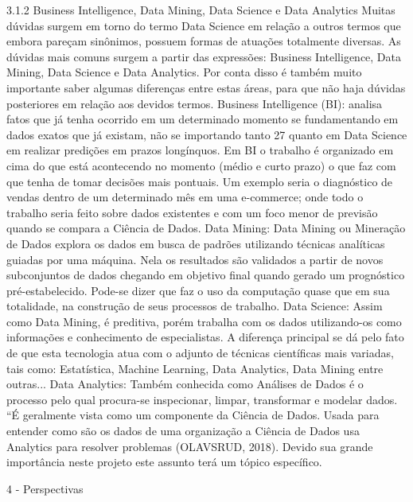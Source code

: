 3.1.2 Business Intelligence, Data Mining, Data Science e Data Analytics
Muitas dúvidas surgem em torno do termo Data Science em relação a outros termos que
embora pareçam sinônimos, possuem formas de atuações totalmente diversas. As
dúvidas mais comuns surgem a partir das expressões: Business Intelligence, Data Mining,
Data Science e Data Analytics. Por conta disso é também muito importante saber
algumas diferenças entre estas áreas, para que não haja dúvidas posteriores em relação
aos devidos termos.
Business Intelligence (BI): analisa fatos que já tenha ocorrido em um determinado
momento se fundamentando em dados exatos que já existam, não se importando tanto 
27
quanto em Data Science em realizar predições em prazos longínquos. Em BI o trabalho é
organizado em cima do que está acontecendo no momento (médio e curto prazo) o que
faz com que tenha de tomar decisões mais pontuais. Um exemplo seria o diagnóstico de
vendas dentro de um determinado mês em uma e-commerce; onde todo o trabalho seria
feito sobre dados existentes e com um foco menor de previsão quando se compara a
Ciência de Dados.
Data Mining: Data Mining ou Mineração de Dados explora os dados em busca de padrões
utilizando técnicas analíticas guiadas por uma máquina. Nela os resultados são validados
a partir de novos subconjuntos de dados chegando em objetivo final quando gerado um
prognóstico pré-estabelecido. Pode-se dizer que faz o uso da computação quase que em
sua totalidade, na construção de seus processos de trabalho.
Data Science: Assim como Data Mining, é preditiva, porém trabalha com os dados
utilizando-os como informações e conhecimento de especialistas. A diferença principal se
dá pelo fato de que esta tecnologia atua com o adjunto de técnicas científicas mais
variadas, tais como: Estatística, Machine Learning, Data Analytics, Data Mining entre
outras...
Data Analytics: Também conhecida como Análises de Dados é o processo pelo qual
procura-se inspecionar, limpar, transformar e modelar dados. “É geralmente vista como
um componente da Ciência de Dados. Usada para entender como são os dados de uma
organização a Ciência de Dados usa Analytics para resolver problemas (OLAVSRUD,
2018). Devido sua grande importância neste projeto este assunto terá um tópico
específico.

4 - Perspectivas

